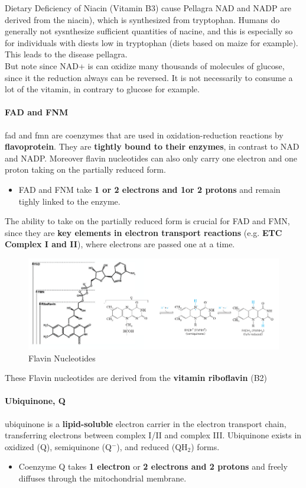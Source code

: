 \documentclass[../main.tex]{subfiles}
\begin{document}
\begin{RemarkWithTitel}{Dietary Deficiency of Niacin (Vitamin B3) cause Pellagra}
	NAD and NADP are derived from the \gls{niacin}), which is synthesized from tryptophan. Humans do generally not sysnthesize sufficient quantities of nacine, and this is especially so for individuals with diests low in tryptophan (diets based on maize for example). This leads to the disease pellagra. \\
	But note since NAD+ is can oxidize many thousands of molecules of glucose, since it the reduction always can be reversed. It is not necessarily to consume a lot of the vitamin, in contrary to glucose for example.  
\end{RemarkWithTitel}

\paragraph{FAD and FNM}
\gls{fad} and \gls{fmn} are coenzymes that are used in oxidation-reduction reactions by \textbf{\gls{flavoprotein}}. They are \textbf{tightly bound to their enzymes}, in contrast to NAD and NADP. Moreover flavin nucleotides can also only carry one electron and one proton taking on the partially reduced form. 
\begin{itemize}
	\item FAD and FNM take \textbf{1 or 2 electrons and 1or 2 protons} and remain tighly linked to the enzyme.
\end{itemize}
The ability to take on the partially reduced form is crucial for FAD and FMN, since they are \textbf{key elements in electron transport reactions} (e.g. \textbf{ETC Complex I and II}), where electrons are passed one at a time. 

\begin{figure}[H]
	\centering
	\includegraphics[width = 0.9 \textwidth]{FAD}
	\caption{Flavin Nucleotides}
\end{figure}
These Flavin nucleotides are derived from the \textbf{vitamin riboflavin} (B2)

\paragraph{Ubiquinone, Q}
\gls{ubiquinone} is a \textbf{lipid-soluble} electron carrier in the electron transport chain, transferring electrons between complex I/II and complex III. Ubiquinone exists in oxidized (Q), semiquinone (Q$^-$), and reduced (QH$_2$) forms.
\begin{itemize}
	\item Coenzyme Q takes \textbf{1 electron} or \textbf{2 electrons and 2 protons} and freely diffuses through the mitochondrial membrane.
\end{itemize}
\end{document}
